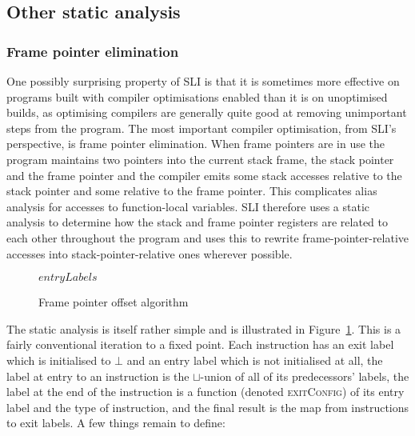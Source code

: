 
\subsection{Other static analysis}

\subsubsection{Frame pointer elimination}


One possibly surprising property of SLI is that it is sometimes more
effective on programs built with compiler optimisations enabled than
it is on unoptimised builds, as optimising compilers are generally
quite good at removing unimportant steps from the program.  The most
important compiler optimisation, from SLI's perspective, is frame
pointer elimination.  When frame pointers are in use the program
maintains two pointers into the current stack frame, the stack pointer
and the frame pointer and the compiler emits some stack accesses
relative to the stack pointer and some relative to the frame pointer.
This complicates alias analysis for accesses to function-local
variables.  SLI therefore uses a static analysis to determine how the
stack and frame pointer registers are related to each other throughout
the program and uses this to rewrite frame-pointer-relative accesses
into stack-pointer-relative ones wherever possible.

\begin{figure}
\begin{algorithmic}
  \EndFor
     \EndFor
  \EndWhile
  \State \Return $entryLabels$
\end{algorithmic}
\caption{Frame pointer offset algorithm}
\label{fig:derive:frame_pointer_alg}
\end{figure}

The static analysis is itself rather simple and is illustrated in
Figure~\ref{fig:derive:frame_pointer_alg}.  This is a fairly
conventional iteration to a fixed point.  Each instruction has an exit
label which is initialised to $\bot$ and an entry label which is not
initialised at all, the label at entry to an instruction is the
$\sqcup$-union of all of its predecessors' labels, the label at the
end of the instruction is a function (denoted \textsc{exitConfig}) of
its entry label and the type of instruction, and the final result is
the map from instructions to exit labels.  A few
things remain to define:

